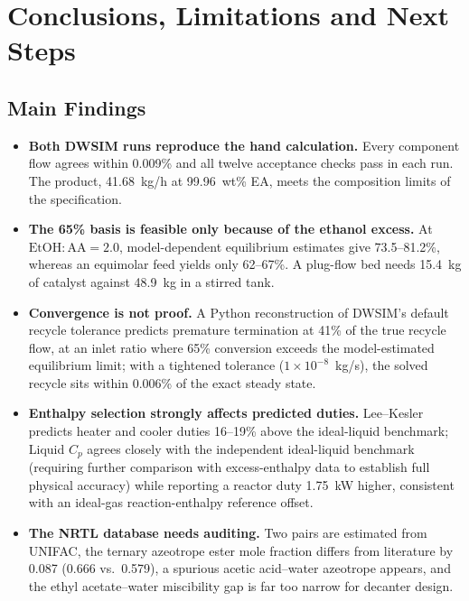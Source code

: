 \documentclass[10pt,a4paper]{article}
\begin{document}
\section{Conclusions, Limitations and Next Steps}

\subsection{Main Findings}
\begin{itemize}
    \item \textbf{Both DWSIM runs reproduce the hand calculation.} Every component flow agrees within 0.009\% and all twelve acceptance checks pass in each run. The product, 41.68~kg/h at 99.96~wt\% EA, meets the composition limits of the specification.
    \item \textbf{The 65\% basis is feasible only because of the ethanol excess.} At $\mathrm{EtOH:AA} = 2.0$, model-dependent equilibrium estimates give 73.5--81.2\%, whereas an equimolar feed yields only 62--67\%. A plug-flow bed needs 15.4~kg of catalyst against 48.9~kg in a stirred tank.
    \item \textbf{Convergence is not proof.} A Python reconstruction of DWSIM's default recycle tolerance predicts premature termination at 41\% of the true recycle flow, at an inlet ratio where 65\% conversion exceeds the model-estimated equilibrium limit; with a tightened tolerance ($1 \times 10^{-8}$~kg/s), the solved recycle sits within 0.006\% of the exact steady state.
    \item \textbf{Enthalpy selection strongly affects predicted duties.} Lee--Kesler predicts heater and cooler duties 16--19\% above the ideal-liquid benchmark; Liquid $C_p$ agrees closely with the independent ideal-liquid benchmark (requiring further comparison with excess-enthalpy data to establish full physical accuracy) while reporting a reactor duty 1.75~kW higher, consistent with an ideal-gas reaction-enthalpy reference offset.
    \item \textbf{The NRTL database needs auditing.} Two pairs are estimated from UNIFAC, the ternary azeotrope ester mole fraction differs from literature by 0.087 (0.666 vs.\ 0.579), a spurious acetic acid--water azeotrope appears, and the ethyl acetate--water miscibility gap is far too narrow for decanter design.
\end{itemize}
\end{document}
